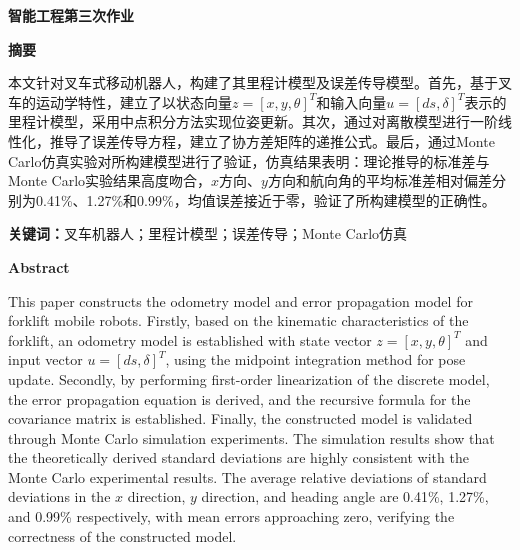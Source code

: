\documentclass[12pt,a4paper]{article}
\begin{document}
\begin{center}
{\heiti\fontsize{22pt}{22pt}\bfseries 智能工程第三次作业}

\vspace{24pt}
\end{center}

\begin{center}
{\heiti\fontsize{18pt}{18pt}\bfseries 摘\quad 要}

\vspace{18pt}
\end{center}

\setlength{\parindent}{2em}
\fontsize{12pt}{20pt}\selectfont

本文针对叉车式移动机器人，构建了其里程计模型及误差传导模型。首先，基于叉车的运动学特性，建立了以状态向量$z=[x,y,\theta]^T$和输入向量$u=[ds,\delta]^T$表示的里程计模型，采用中点积分方法实现位姿更新。其次，通过对离散模型进行一阶线性化，推导了误差传导方程，建立了协方差矩阵的递推公式。最后，通过Monte Carlo仿真实验对所构建模型进行了验证，仿真结果表明：理论推导的标准差与Monte Carlo实验结果高度吻合，$x$方向、$y$方向和航向角的平均标准差相对偏差分别为0.41\%、1.27\%和0.99\%，均值误差接近于零，验证了所构建模型的正确性。

\vspace{6pt}
\noindent\textbf{关键词：}叉车机器人；里程计模型；误差传导；Monte Carlo仿真

\vspace{24pt}

\begin{center}
{\fontsize{18pt}{18pt}\bfseries Abstract}

\vspace{18pt}
\end{center}

\setlength{\parindent}{2em}
\fontsize{12pt}{20pt}\selectfont

This paper constructs the odometry model and error propagation model for forklift mobile robots. Firstly, based on the kinematic characteristics of the forklift, an odometry model is established with state vector $z=[x,y,\theta]^T$ and input vector $u=[ds,\delta]^T$, using the midpoint integration method for pose update. Secondly, by performing first-order linearization of the discrete model, the error propagation equation is derived, and the recursive formula for the covariance matrix is established. Finally, the constructed model is validated through Monte Carlo simulation experiments. The simulation results show that the theoretically derived standard deviations are highly consistent with the Monte Carlo experimental results. The average relative deviations of standard deviations in the $x$ direction, $y$ direction, and heading angle are 0.41\%, 1.27\%, and 0.99\% respectively, with mean errors approaching zero, verifying the correctness of the constructed model.
\end{document}
